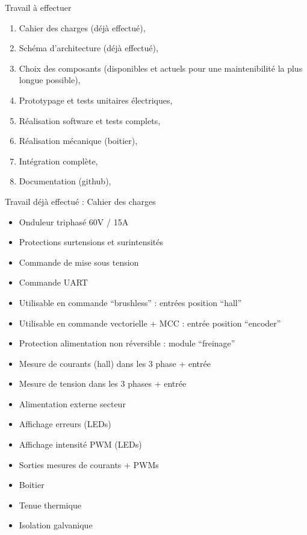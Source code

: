 \documentclass[aspectratio=169]{beamer}
\begin{document}
\begin{frame}{Travail à effectuer}
\begin{enumerate}
	\item Cahier des charges (déjà effectué),
	\item Schéma d'architecture (déjà effectué),
	\item Choix des composants (disponibles et actuels pour une maintenibilité la plus longue possible),
	\item Prototypage et tests unitaires électriques,
	\item Réalisation software et tests complets,
	\item Réalisation mécanique (boitier),
	\item Intégration complète,
	\item Documentation (github),
\end{enumerate}
\end{frame}

\begin{frame}{Travail déjà effectué : Cahier des charges}
\begin{itemize}
	\item Onduleur triphasé 60V / 15A
	\item Protections surtensions et surintensités
	\item Commande de mise sous tension
	\item Commande UART
	\item Utilisable en commande ``brushless'' :  entrées position ``hall'' 
	\item Utilisable en commande vectorielle + MCC : entrée position ``encoder''
	\item Protection alimentation non réversible : module ``freinage''
	\item Mesure de courants (hall) dans les 3 phase + entrée
	\item Mesure de tension dans les 3 phases + entrée
	\item Alimentation externe secteur
	\item Affichage erreurs (LEDs)
	\item Affichage intensité PWM (LEDs)
	\item Sorties mesures de courants + PWMs
	\item Boitier
	\item Tenue thermique
	\item Isolation galvanique
\end{itemize}
\end{frame}
\end{document}
